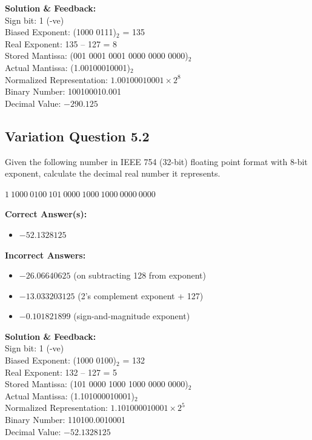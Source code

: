 \textbf{Solution \& Feedback:}\\
Sign bit: 1 (-ve)\\
Biased Exponent: (1000 0111)$_2$ = 135\\
Real Exponent: 135 – 127 = 8\\
Stored Mantissa: (001 0001 0001 0000 0000 0000)$_2$\\
Actual Mantissa: (1.00100010001)$_2$\\
Normalized Representation: $1.00100010001 \times 2^8$\\
Binary Number: 100100010.001\\
Decimal Value: $-290.125$

\subsection{Variation Question 5.2}

Given the following number in IEEE 754 (32-bit) floating point format with 8-bit exponent, calculate the decimal real number it represents.

$1\ 1000\ 0100\ 101\ 0000\ 1000\ 1000\ 0000\ 0000$

\textbf{Correct Answer(s):}
\begin{itemize}
    \item $-52.1328125$
\end{itemize}

\textbf{Incorrect Answers:}
\begin{itemize}
    \item $-26.06640625$ (on subtracting 128 from exponent)
    \item $-13.033203125$ (2’s complement exponent + 127)
    \item $-0.101821899$ (sign-and-magnitude exponent)
\end{itemize}

\textbf{Solution \& Feedback:}\\
Sign bit: 1 (-ve)\\
Biased Exponent: (1000 0100)$_2$ = 132\\
Real Exponent: 132 – 127 = 5\\
Stored Mantissa: (101 0000 1000 1000 0000 0000)$_2$\\
Actual Mantissa: (1.101000010001)$_2$\\
Normalized Representation: $1.101000010001 \times 2^5$\\
Binary Number: 110100.0010001\\
Decimal Value: $-52.1328125$

